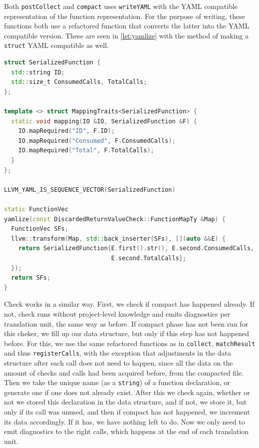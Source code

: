 Both \texttt{postCollect} and \texttt{compact} uses \texttt{writeYAML} with the YAML compatible representation of the function representation. For the
purpose of writing, these functions both use a refactored function that converts the latter into the YAML compatible version. These are seen in
\cref{lst:yamlize} with the method of making a \lstinline{struct} YAML compatible as well.

\begin{lstlisting}[language={C++},caption={Steps for making the data YAML writable.},label={lst:yamlize}]
struct SerializedFunction {
  std::string ID;
  std::size_t ConsumedCalls, TotalCalls;
};

template <> struct MappingTraits<SerializedFunction> {
  static void mapping(IO &IO, SerializedFunction &F) {
    IO.mapRequired("ID", F.ID);
    IO.mapRequired("Consumed", F.ConsumedCalls);
    IO.mapRequired("Total", F.TotalCalls);
  }
};

LLVM_YAML_IS_SEQUENCE_VECTOR(SerializedFunction)

static FunctionVec
yamlize(const DiscardedReturnValueCheck::FunctionMapTy &Map) {
  FunctionVec SFs;
  llvm::transform(Map, std::back_inserter(SFs), [](auto &&E) {
    return SerializedFunction{E.first().str(), E.second.ConsumedCalls,
                              E.second.TotalCalls};
  });
  return SFs;
}
\end{lstlisting}

Check works in a similar way. First, we check if compact has happened already. If not, check runs without project-level knowledge and emits diagnostics
per translation unit, the same
way as before. If compact phase has not been run for this cheker, we fill up our data structure, but only if this step has not happened before.
For this, we use the same refactored functions as in \texttt{collect}, \texttt{matchResult} and thus \texttt{registerCalls}, with the exception
that adjustments in the data structure after each call does not need to happen, since all the data on the amount of checks and calls had been acquired before,
from the compacted file. Then we take the unique name (as a \lstinline{string}) of a function
declaration, or generate one if one does not already exist. After this we check again, whether or not we stored this declaration in the data structure,
and if not, we store it, but only if its call was unused, and then if compact has not happened, we increment its data accordingly. If it
has, we have nothing left to do. Now we only need to emit diagnostics to the right calls, which happens at the end of each translation unit.

